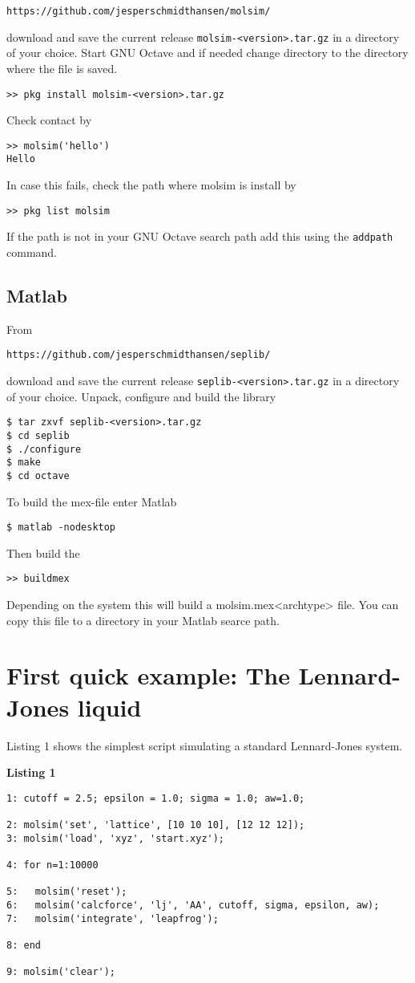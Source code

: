 \documentclass[11pt]{article}
\begin{document}
\begin{verbatim}
https://github.com/jesperschmidthansen/molsim/
\end{verbatim}

\noindent download and save the current release
\verb!molsim-<version>.tar.gz! in a directory of your choice. Start GNU
Octave and if needed change directory to the directory where the file is saved.
\begin{verbatim}
>> pkg install molsim-<version>.tar.gz 
\end{verbatim}
Check contact by
\begin{verbatim}
>> molsim('hello')
Hello 
\end{verbatim}
In case this fails, check the path where \textsf{molsim} is install by
\begin{verbatim}
>> pkg list molsim
\end{verbatim}
If the path is not in your GNU Octave search path add this using the
\verb!addpath! command.

\subsection{Matlab}
From
\begin{verbatim}
https://github.com/jesperschmidthansen/seplib/
\end{verbatim}
\noindent download and save the current release \verb!seplib-<version>.tar.gz!
in a directory of your choice. Unpack, configure and build the library
\begin{verbatim}
$ tar zxvf seplib-<version>.tar.gz
$ cd seplib
$ ./configure
$ make
$ cd octave
\end{verbatim}
To build the \textsf{mex}-file enter Matlab
\begin{verbatim}
$ matlab -nodesktop
\end{verbatim}
Then build the 
\begin{verbatim}
>> buildmex
\end{verbatim}
Depending on the system this will build a \textsf{molsim.mex<archtype>}
file. You can copy this file to a directory in your Matlab searce path.

\section{First quick example: The Lennard-Jones liquid}
Listing 1 shows the simplest script simulating a standard Lennard-Jones system.

\noindent \textbf{Listing 1}
\begin{verbatim}
1: cutoff = 2.5; epsilon = 1.0; sigma = 1.0; aw=1.0;

2: molsim('set', 'lattice', [10 10 10], [12 12 12]);
3: molsim('load', 'xyz', 'start.xyz');

4: for n=1:10000

5:   molsim('reset');
6:   molsim('calcforce', 'lj', 'AA', cutoff, sigma, epsilon, aw);
7:   molsim('integrate', 'leapfrog');
 
8: end

9: molsim('clear');
\end{verbatim}
\end{document}
